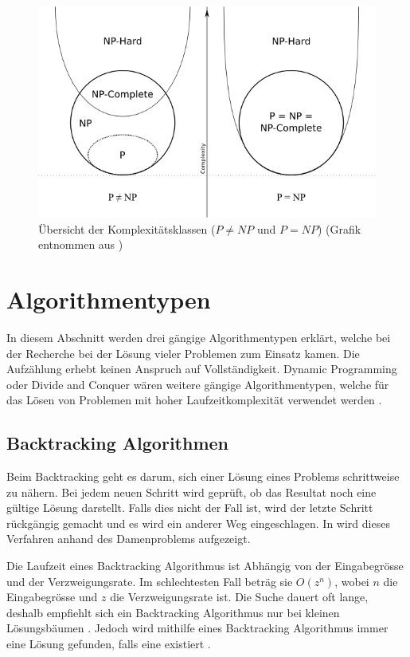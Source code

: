 \begin{figure}[h]
\includegraphics[scale=0.65]{images/einleitung/p_np_np-complete_np-hard.png}
\caption[Übersicht der Komplexitätsklassen ($P!=NP$ und $P=NP$)]{Übersicht der Komplexitätsklassen ($P \neq NP$ und $P=NP$) (Grafik entnommen aus \cite{pic_p_np})}
\label{fig:complexity_overview}
\end{figure}

\section{Algorithmentypen}\label{algo_types}
In diesem Abschnitt werden drei gängige Algorithmentypen erklärt, welche bei der Recherche bei der Lösung vieler Problemen zum 
Einsatz kamen. Die Aufzählung erhebt keinen Anspruch auf Vollständigkeit. Dynamic Programming oder Divide and Conquer wären 
weitere gängige Algorithmentypen, welche für das Lösen von Problemen mit hoher Laufzeitkomplexität verwendet werden \cite{vazirani_algorithm}.

\subsection{Backtracking Algorithmen}\label{backtracking_algos}
Beim Backtracking geht es darum, sich einer Lösung eines Problems schrittweise zu nähern. Bei jedem neuen Schritt wird geprüft, ob das Resultat noch eine gültige Lösung darstellt. Falls dies 
nicht der Fall ist, wird der letzte Schritt rückgängig gemacht und es wird ein anderer Weg eingeschlagen. In \cite{backtracking} wird dieses Verfahren anhand des Damenproblems aufgezeigt.

Die Laufzeit eines Backtracking Algorithmus ist Abhängig von der Eingabegrösse und der Verzweigungsrate. Im schlechtesten Fall beträg sie
$O(z^n)$, wobei $n$ die Eingabegrösse und $z$ die Verzweigungsrate ist. Die Suche dauert oft lange, deshalb empfiehlt sich ein Backtracking 
Algorithmus nur bei kleinen Lösungsbäumen \cite{stephens2013essential}. Jedoch wird mithilfe eines Backtracking Algorithmus immer eine Lösung gefunden, falls 
eine existiert \cite{pomberger2008algorithmen}.

